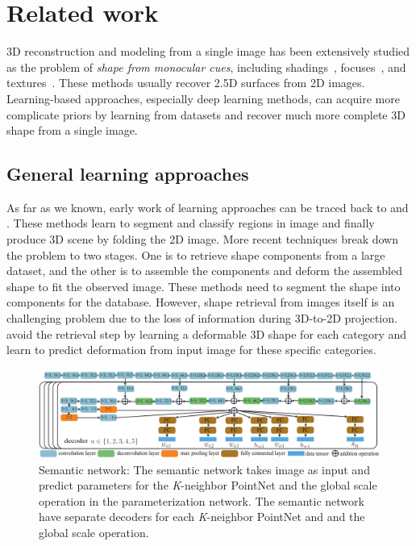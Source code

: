 \section{Related work}
3D reconstruction and modeling from a single image has been extensively studied as the problem of \emph{shape from monocular cues}, including shadings~\cite{shapefromshadingsurvey}, focuses~\cite{shapefromdf1,shapefromdf2}, and textures~\cite{Aloimonos1988}. 
These methods usually recover 2.5D surfaces from 2D images. 
Learning-based approaches, especially deep learning methods, can acquire more complicate priors by learning from datasets and recover much more complete 3D shape from a single image.
 
\subsection{General learning approaches}
As far as we known, early work of learning approaches can be traced back to \cite{Hoiem2007} and \cite{learn3D2007}. These methods learn to segment and classify regions in image and finally produce 3D scene by folding the 2D image.
%
More recent techniques break down the problem to two stages\cite{Su:2014,jointimgshape}. One is to retrieve shape components from a large dataset, and the other is to assemble the components and deform the assembled shape to fit the observed image. These methods need to segment the shape into components for the database.
%
However, shape retrieval from images itself is an challenging problem due to the loss of information during 3D-to-2D projection. 
\cite{imgrecon15} avoid the retrieval step by learning a deformable 3D shape for each category and learn to predict deformation from input image for these specific categories.
%

\begin{figure}[htbp]
	\centering
	\includegraphics[width=\linewidth]{img/net/semnet}
	\caption{Semantic network: The semantic network takes image as input and predict parameters for the \textit{K}-neighbor PointNet and the global scale operation in the parameterization network. The semantic network have separate decoders for each \textit{K}-neighbor PointNet and and the global scale operation. }
	\label{fig:semnet}
\end{figure}


